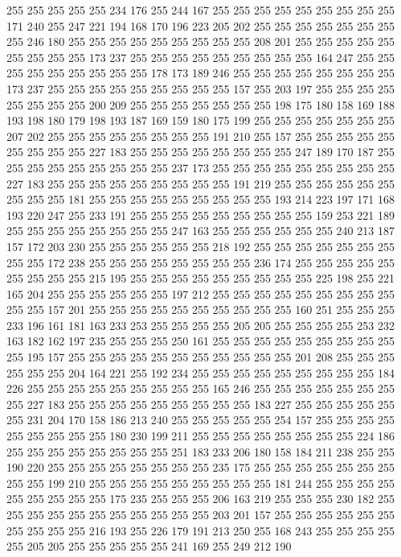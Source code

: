 255 255 255 255 255 234 176 255 244 167 255 255 255 255 255 255 255 255 255 171
240 255 247 221 194 168 170 196 223 205 202 255 255 255 255 255 255 255 255 246
180 255 255 255 255 255 255 255 255 255 208 201 255 255 255 255 255 255 255 255
255 173 237 255 255 255 255 255 255 255 255 255 164 247 255 255 255 255 255 255
255 255 255 178 173 189 246 255 255 255 255 255 255 255 255 173 237 255 255 255
255 255 255 255 255 255 157 255 203 197 255 255 255 255 255 255 255 255 200 209
255 255 255 255 255 255 255 198 175 180 158 169 188 193 198 180 179 198 193 187
169 159 180 175 199 255 255 255 255 255 255 255 207 202 255 255 255 255 255 255
255 255 191 210 255 157 255 255 255 255 255 255 255 255 255 227 183 255 255 255
255 255 255 255 255 247 189 170 187 255 255 255 255 255 255 255 255 255 237 173
255 255 255 255 255 255 255 255 255 227 183 255 255 255 255 255 255 255 255 255
191 219 255 255 255 255 255 255 255 255 255 181 255 255 255 255 255 255 255 255
255 193 214 223 197 171 168 193 220 247 255 233 191 255 255 255 255 255 255 255
255 255 159 253 221 189 255 255 255 255 255 255 255 255 247 163 255 255 255 255
255 255 240 213 187 157 172 203 230 255 255 255 255 255 255 218 192 255 255 255
255 255 255 255 255 255 172 238 255 255 255 255 255 255 255 255 236 174 255 255
255 255 255 255 255 255 255 215 195 255 255 255 255 255 255 255 255 255 225 198
255 221 165 204 255 255 255 255 255 255 197 212 255 255 255 255 255 255 255 255
255 255 255 157 201 255 255 255 255 255 255 255 255 255 255 160 251 255 255 255
233 196 161 181 163 233 253 255 255 255 255 205 205 255 255 255 255 253 232 163
182 162 197 235 255 255 255 250 161 255 255 255 255 255 255 255 255 255 255 195
157 255 255 255 255 255 255 255 255 255 255 255 201 208 255 255 255 255 255 255
204 164 221 255 192 234 255 255 255 255 255 255 255 255 255 184 226 255 255 255
255 255 255 255 255 255 165 246 255 255 255 255 255 255 255 255 227 183 255 255
255 255 255 255 255 255 255 183 227 255 255 255 255 255 255 231 204 170 158 186
213 240 255 255 255 255 255 254 157 255 255 255 255 255 255 255 255 255 180 230
199 211 255 255 255 255 255 255 255 255 224 186 255 255 255 255 255 255 255 255
251 183 233 206 180 158 184 211 238 255 255 190 220 255 255 255 255 255 255 255
255 235 175 255 255 255 255 255 255 255 255 255 199 210 255 255 255 255 255 255
255 255 255 181 244 255 255 255 255 255 255 255 255 255 175 235 255 255 255 206
163 219 255 255 255 230 182 255 255 255 255 255 255 255 255 255 255 255 203 201
157 255 255 255 255 255 255 255 255 255 255 216 193 255 226 179 191 213 250 255
168 243 255 255 255 255 255 205 205 255 255 255 255 255 241 169 255 249 212 190
